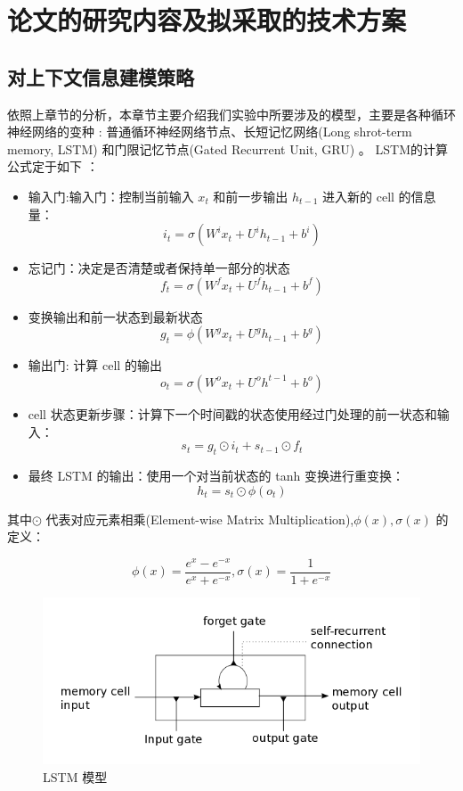 \documentclass[twoside]{buaathesis}
\begin{document}
\section{论文的研究内容及拟采取的技术方案}
\subsection{对上下文信息建模策略}
依照上章节的分析，本章节主要介绍我们实验中所要涉及的模型，主要是各种循环神经网络的变种 \cite{DBLP:conf/icml/JozefowiczZS15}: 普通循环神经网络节点、长短记忆网络(Long shrot-term memory, LSTM) \cite{DBLP:journals/taslp/SundermeyerNS15} 和门限记忆节点(Gated Recurrent Unit, GRU) \cite{DBLP:conf/nips/ChungKDGCB15}。 LSTM的计算公式定于如下 \cite{DBLP:journals/neco/HochreiterS97}：
\begin{itemize}
\item 输入门:输入门：控制当前输入 $x_t$ 和前一步输出 $h_{t−1}$ 进入新的 cell 的信息量：
$$i_t=\sigma(W^i x_t+U^i h_{t-1}+b^i)$$
\item  忘记门：决定是否清楚或者保持单一部分的状态
$$f_t=\sigma(W^f x_t+U^f h_{t-1}+b^f)$$
\item  变换输出和前一状态到最新状态
$$g_t=\phi(W^g x_t+U^g h_{t-1}+b^g)$$
\item  输出门: 计算 cell 的输出
$$o_t=\sigma(W^o x_t+U^o h^{t-1}+b^o)$$
\item  cell 状态更新步骤：计算下一个时间戳的状态使用经过门处理的前一状态和输入：
$$s_t=g_t\odot i_t+s_{t-1}\odot f_t$$
\item  最终 LSTM 的输出：使用一个对当前状态的 tanh 变换进行重变换：
$$h_t=s_t\odot \phi(o_t)$$
\end{itemize}
其中$\odot$ 代表对应元素相乘(Element-wise Matrix Multiplication),$\phi(x), \sigma(x)$ 的定义：

\begin{equation}\label{equ:tanh}
  \phi(x)=\frac{e^x-e^{-x}}{e^x+e^{-x}},\sigma(x)=\frac{1}{1+e^{-x}}
\end{equation}

\begin{figure}
  \centering
  \includegraphics[width=0.9\linewidth]{./figures/lstm_memorycell.png}
  \caption{LSTM 模型}\label{fig:lstm}
\end{figure}
\end{document}
